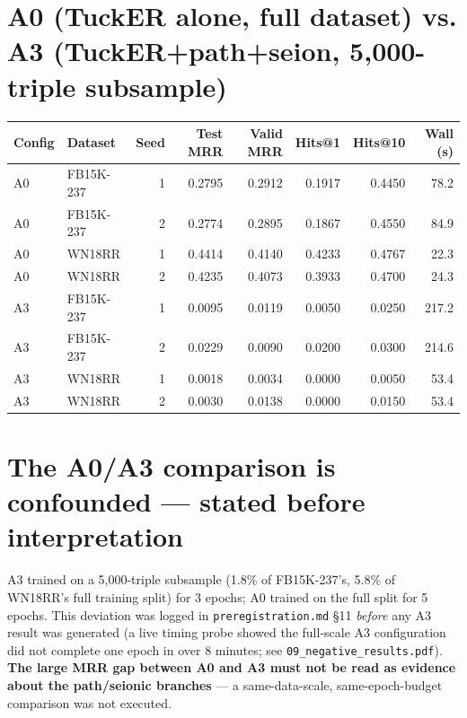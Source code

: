 \documentclass[11pt]{article}
\begin{document}
\section{A0 (TuckER alone, full dataset) vs. A3 (TuckER+path+seion, 5{,}000-triple subsample)}
\begin{center}
\small
\begin{tabular}{llrrrrrr}
\toprule
Config & Dataset & Seed & Test MRR & Valid MRR & Hits@1 & Hits@10 & Wall (s) \\
\midrule
A0 & FB15K-237 & 1 & 0.2795 & 0.2912 & 0.1917 & 0.4450 & 78.2 \\
A0 & FB15K-237 & 2 & 0.2774 & 0.2895 & 0.1867 & 0.4550 & 84.9 \\
A0 & WN18RR    & 1 & 0.4414 & 0.4140 & 0.4233 & 0.4767 & 22.3 \\
A0 & WN18RR    & 2 & 0.4235 & 0.4073 & 0.3933 & 0.4700 & 24.3 \\
\midrule
A3 & FB15K-237 & 1 & 0.0095 & 0.0119 & 0.0050 & 0.0250 & 217.2 \\
A3 & FB15K-237 & 2 & 0.0229 & 0.0090 & 0.0200 & 0.0300 & 214.6 \\
A3 & WN18RR    & 1 & 0.0018 & 0.0034 & 0.0000 & 0.0050 & 53.4 \\
A3 & WN18RR    & 2 & 0.0030 & 0.0138 & 0.0000 & 0.0150 & 53.4 \\
\bottomrule
\end{tabular}
\end{center}

\section{The A0/A3 comparison is confounded --- stated before interpretation}
A3 trained on a 5{,}000-triple subsample (1.8\% of FB15K-237's, 5.8\% of WN18RR's full training
split) for 3 epochs; A0 trained on the full split for 5 epochs. This deviation was logged in
\texttt{preregistration.md} \S11 \emph{before} any A3 result was generated (a live timing probe
showed the full-scale A3 configuration did not complete one epoch in over 8 minutes; see
\texttt{09\_negative\_results.pdf}). \textbf{The large MRR gap
between A0 and A3 must not be read as evidence about the path/seionic branches} --- a
same-data-scale, same-epoch-budget comparison was not executed.
\end{document}
